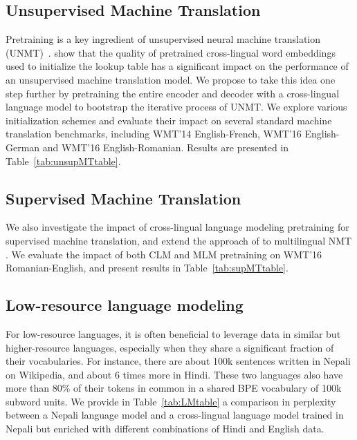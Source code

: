 \documentclass[11pt,a4paper]{article}
\begin{document}
\subsection{Unsupervised Machine Translation}
\label{sec:unsupMT}

Pretraining is a key ingredient of unsupervised neural machine translation (UNMT)~\cite{unsupNMTlample,unsupNMTartetxe}. \citet{lample2018phrase} show that the quality of pretrained cross-lingual word embeddings used to initialize the lookup table has a significant impact on the performance of an unsupervised machine translation model. We propose to take this idea one step further by pretraining the entire encoder and decoder with a cross-lingual language model to bootstrap the iterative process of UNMT. We explore various initialization schemes and evaluate their impact on several standard machine translation benchmarks, including WMT'14 English-French, WMT'16 English-German and WMT'16 English-Romanian. Results are presented in Table~\ref{tab:unsupMTtable}.


\subsection{Supervised Machine Translation}
We also investigate the impact of cross-lingual language modeling pretraining for supervised machine translation, and extend the approach of \citet{ramachandran2016unsupervised} to multilingual NMT \cite{johnson2017google}. We evaluate the impact of both CLM and MLM pretraining on WMT'16 Romanian-English, and present results in Table~\ref{tab:supMTtable}.

\subsection{Low-resource language modeling}
For low-resource languages, it is often beneficial to leverage data in similar but higher-resource languages, especially when they share a significant fraction of their vocabularies. For instance, there are about 100k sentences written in Nepali on Wikipedia, and about 6 times more in Hindi. These two languages also have more than 80\% of their tokens in common in a shared BPE vocabulary of 100k subword units. We provide in Table~\ref{tab:LMtable} a comparison in perplexity between a Nepali language model and a cross-lingual language model trained in Nepali but enriched with different combinations of Hindi and English data.
\end{document}
